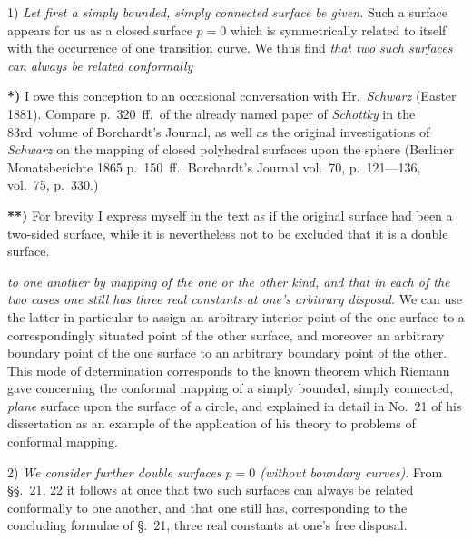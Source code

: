 \documentclass{article}
\begin{document}
1) \emph{Let first a simply bounded, simply connected surface be given.} Such a surface appears for us as a closed surface $p = 0$ which is symmetrically related to itself with the occurrence of one transition curve. We thus find \emph{that two such surfaces can always be related conformally}

\textbf{*)} I owe this conception to an occasional conversation with Hr.\ \emph{Schwarz} (Easter 1881). Compare p.~320~ff.\ of the already named paper of \emph{Schottky} in the 83rd\ volume of Borchardt's Journal, as well as the original investigations of \emph{Schwarz} on the mapping of closed polyhedral surfaces upon the sphere (Berliner Monatsberichte 1865 p.~150~ff., Borchardt's Journal vol.~70, p.~121---136, vol.~75, p.~330.)

\textbf{**)} For brevity I express myself in the text as if the original surface had been a two-sided surface, while it is nevertheless not to be excluded that it is a double surface.

\emph{to one another by mapping of the one or the other kind, and that in each of the two cases one still has three real constants at one's arbitrary disposal.} We can use the latter in particular to assign an arbitrary interior point of the one surface to a correspondingly situated point of the other surface, and moreover an arbitrary boundary point of the one surface to an arbitrary boundary point of the other. This mode of determination corresponds to the known theorem which Riemann gave concerning the conformal mapping of a simply bounded, simply connected, \emph{plane} surface upon the surface of a circle, and explained in detail in No.~21 of his dissertation as an example of the application of his theory to problems of conformal mapping.

2) \emph{We consider further double surfaces $p = 0$ (without boundary curves).} From §§.~21, 22 it follows at once that two such surfaces can always be related conformally to one another, and that one still has, corresponding to the concluding formulae of §.~21, three real constants at one's free disposal.
\end{document}
